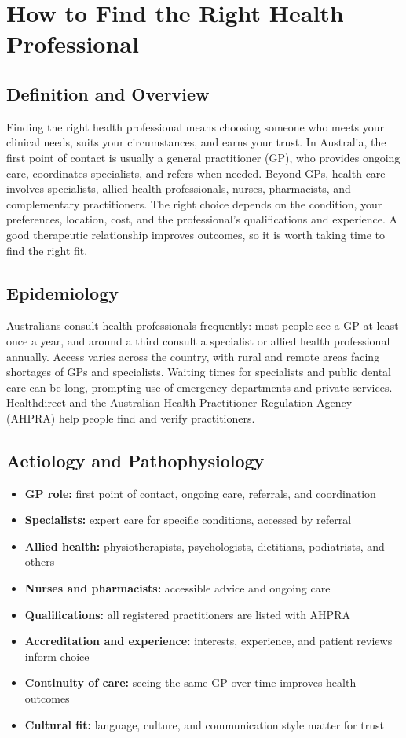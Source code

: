 \chapter{How to Find the Right Health Professional}

\section*{Definition and Overview}
Finding the right health professional means choosing someone who meets your clinical needs, suits your circumstances, and earns your trust. In Australia, the first point of contact is usually a general practitioner (GP), who provides ongoing care, coordinates specialists, and refers when needed. Beyond GPs, health care involves specialists, allied health professionals, nurses, pharmacists, and complementary practitioners. The right choice depends on the condition, your preferences, location, cost, and the professional's qualifications and experience. A good therapeutic relationship improves outcomes, so it is worth taking time to find the right fit.

\section*{Epidemiology}
Australians consult health professionals frequently: most people see a GP at least once a year, and around a third consult a specialist or allied health professional annually. Access varies across the country, with rural and remote areas facing shortages of GPs and specialists. Waiting times for specialists and public dental care can be long, prompting use of emergency departments and private services. Healthdirect and the Australian Health Practitioner Regulation Agency (AHPRA) help people find and verify practitioners.

\section*{Aetiology and Pathophysiology}
\begin{itemize}
    \item \textbf{GP role:} first point of contact, ongoing care, referrals, and coordination
    \item \textbf{Specialists:} expert care for specific conditions, accessed by referral
    \item \textbf{Allied health:} physiotherapists, psychologists, dietitians, podiatrists, and others
    \item \textbf{Nurses and pharmacists:} accessible advice and ongoing care
    \item \textbf{Qualifications:} all registered practitioners are listed with AHPRA
    \item \textbf{Accreditation and experience:} interests, experience, and patient reviews inform choice
    \item \textbf{Continuity of care:} seeing the same GP over time improves health outcomes
    \item \textbf{Cultural fit:} language, culture, and communication style matter for trust
\end{itemize}

